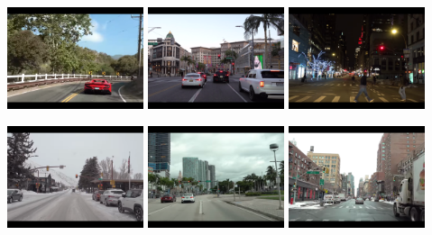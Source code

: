 \documentclass[letterpaper, 12pt]{book}
\theoremstyle{definition}
\theoremstyle{definition}
\theoremstyle{definition}
\theoremstyle{definition}
\theoremstyle{definition}
\begin{document}
{\begin{center}
\includegraphics[trim={0 0.75cm 0 0.75cm},clip,width=0.3\textwidth]{./img/scenes/1.png}
\includegraphics[trim={0 0.75cm 0 0.75cm},clip,width=0.3\textwidth]{./img/scenes/2.png}
\includegraphics[trim={0 0.75cm 0 0.75cm},clip,width=0.3\textwidth]{./img/scenes/3.png}

\includegraphics[trim={0 0.75cm 0 0.75cm},clip,width=0.3\textwidth]{./img/scenes/4.png}
\includegraphics[trim={0 0.75cm 0 0.75cm},clip,width=0.3\textwidth]{./img/scenes/5.png}
\includegraphics[trim={0 0.75cm 0 0.75cm},clip,width=0.3\textwidth]{./img/scenes/6.png}


\end{center}}
\end{document}
